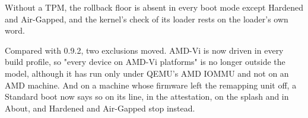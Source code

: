Without a TPM, the rollback floor is absent in every boot mode except Hardened and Air-Gapped, and the kernel's check of its loader rests on the loader's own word.

Compared with 0.9.2, two exclusions moved. AMD-Vi is now driven in every build profile, so "every device on AMD-Vi platforms" is no longer outside the model, although it has run only under QEMU's AMD IOMMU and not on an AMD machine. And on a machine whose firmware left the remapping unit off, a Standard boot now says so on its \code{[IOMMU]} line, in the attestation, on the splash and in About, and Hardened and Air-Gapped stop instead.
